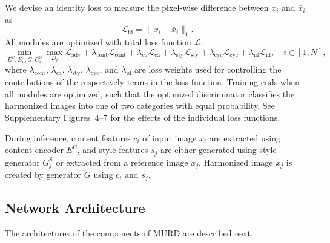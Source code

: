 \documentclass{nature}
\begin{document}
\begin{methods}
We devise an identity loss to measure the pixel-wise difference between $x_i$ and $\bar{x}_i$ as
\begin{equation}
\mathcal{L}_\text{id}=\|x_i-\bar{x}_i\|_1.
\end{equation}
All modules are optimized with total loss function $\mathcal{L}$:
\begin{equation}\label{eq:TotalLoss}
\min_{E^{\text{C}},E^{\text{S}}_i,G,G^{\text{S}}_i}\max_{D_i} \mathcal{L}_\text{adv}+\lambda_\text{cont}\mathcal{L}_\text{cont}+\lambda_{ca}\mathcal{L}_\text{ca}+\lambda_\text{sty}\mathcal{L}_\text{sty}+\lambda_\text{cyc}\mathcal{L}_\text{cyc}+\lambda_\text{id}\mathcal{L}_\text{id},\quad i\in[1,N],
\end{equation}
where $\lambda_\text{cont}$, $\lambda_\text{ca}$, $\lambda_\text{sty}$, $\lambda_\text{cyc}$, and $\lambda_\text{id}$ are loss weights used for controlling the contributions of the respectively terms in the loss function.
Training ends when all modules are optimized, such that the optimized discriminator classifies the harmonized images into one of two categories with equal probability.
See Supplementary Figures~4--7 for the effects of the individual loss functions.

During inference, content features $c_i$ of input image $x_i$ are extracted using content encoder $E^{\text{C}}$, and style features $s_j$ are either generated using style generator $G^{\text{S}}_j$ or extracted from a reference image $x_j$. Harmonized image $\tilde{x}_j$ is created by generator $G$ using $c_i$ and $s_j$.

\subsection{Network Architecture}
The architectures of the components of MURD are 
described next.


\end{methods}
\end{document}
